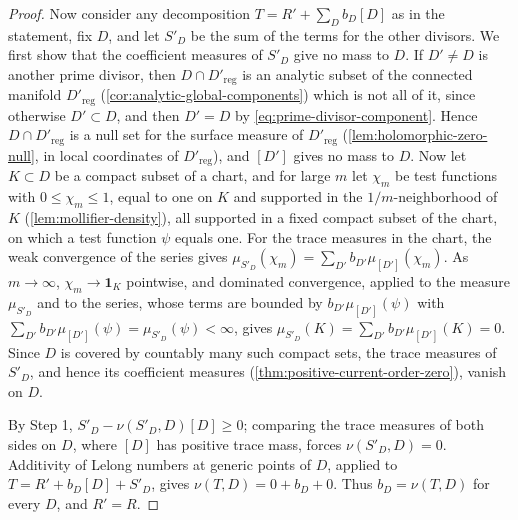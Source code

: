 \begin{proof}
Now consider any decomposition $T=R'+\sum_Db_D[D]$ as in the statement, fix $D$, and let $S'_D$ be the sum of the terms for the other divisors. We first show that the coefficient measures of $S'_D$ give no mass to $D$. If $D'\neq D$ is another prime divisor, then $D\cap D'_{\mathrm{reg}}$ is an analytic subset of the connected manifold $D'_{\mathrm{reg}}$ (\cref{cor:analytic-global-components}) which is not all of it, since otherwise $D'\subset D$, and then $D'=D$ by \eqref{eq:prime-divisor-component}. Hence $D\cap D'_{\mathrm{reg}}$ is a null set for the surface measure of $D'_{\mathrm{reg}}$ (\cref{lem:holomorphic-zero-null}, in local coordinates of $D'_{\mathrm{reg}}$), and $[D']$ gives no mass to $D$. Now let $K\subset D$ be a compact subset of a chart, and for large $m$ let $\chi_m$ be test functions with $0\leq\chi_m\leq1$, equal to one on $K$ and supported in the $1/m$-neighborhood of $K$ (\cref{lem:mollifier-density}), all supported in a fixed compact subset of the chart, on which a test function $\psi$ equals one. For the trace measures in the chart, the weak convergence of the series gives $\mu_{S'_D}(\chi_m)=\sum_{D'}b_{D'}\mu_{[D']}(\chi_m)$. As $m\to\infty$, $\chi_m\to\mathbf1_K$ pointwise, and dominated convergence, applied to the measure $\mu_{S'_D}$ and to the series, whose terms are bounded by $b_{D'}\mu_{[D']}(\psi)$ with $\sum_{D'}b_{D'}\mu_{[D']}(\psi)=\mu_{S'_D}(\psi)<\infty$, gives $\mu_{S'_D}(K)=\sum_{D'}b_{D'}\mu_{[D']}(K)=0$. Since $D$ is covered by countably many such compact sets, the trace measures of $S'_D$, and hence its coefficient measures (\cref{thm:positive-current-order-zero}), vanish on $D$.

By Step 1, $S'_D-\nu(S'_D,D)[D]\geq0$; comparing the trace measures of both sides on $D$, where $[D]$ has positive trace mass, forces $\nu(S'_D,D)=0$. Additivity of Lelong numbers at generic points of $D$, applied to $T=R'+b_D[D]+S'_D$, gives $\nu(T,D)=0+b_D+0$. Thus $b_D=\nu(T,D)$ for every $D$, and $R'=R$.
\end{proof}

